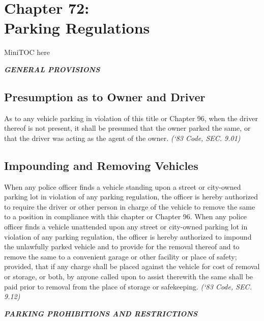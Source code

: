 %
\chapter*{Chapter 72: \\
	Parking Regulations}

MiniTOC here
\pagebreak


\begin{center}
\emph{\textbf{\LARGE{GENERAL PROVISIONS}}}
\end{center}

\section{Presumption as to Owner and Driver}
As to any vehicle parking in violation of this title or Chapter 96, when the driver thereof is not present, it shall be presumed that the owner parked the same, or that the driver was acting as the agent of the owner.\newline
\emph{(‘83 Code, SEC. 9.01)}

\section{Impounding and Removing Vehicles}
When any police officer finds a vehicle standing upon a street or city-owned parking lot in violation of any parking regulation, the officer is hereby authorized to require the driver or other person in charge of the vehicle to remove the same to a position in compliance with this chapter or Chapter 96. When any police officer finds a vehicle unattended upon any street or city-owned parking lot in violation of any parking regulation, the officer is hereby authorized to impound the unlawfully parked vehicle and to provide for the removal thereof and to remove the same to a convenient garage or other facility or place of safety; provided, that if any charge shall be placed against the vehicle for cost of removal or storage, or both, by anyone called upon to assist therewith the same shall be paid prior to removal from the place of storage or safekeeping.\newline
\emph{(‘83 Code, SEC. 9.12)}\newline


\begin{center}
\emph{\textbf{\LARGE{PARKING PROHIBITIONS AND RESTRICTIONS}}}
\end{center}

